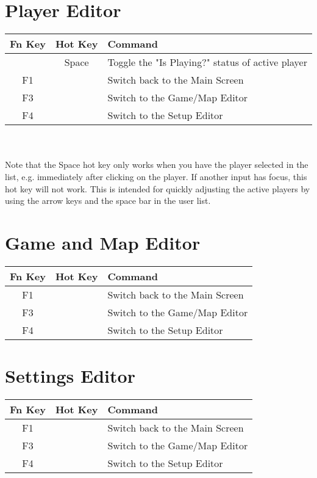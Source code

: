 \documentclass[10pt,a4paper]{report}
\begin{document}
\section{Player Editor}
\begin{tabular}{c|c|l}
Fn Key & Hot Key & Command \\
\hline
& Space & Toggle the "Is Playing?" status of active player \\
F1 & & Switch back to the Main Screen \\
F3 & & Switch to the Game/Map Editor \\
F4 & & Switch to the Setup Editor \\
\end{tabular}
\\
\\
Note that the Space hot key only works when you have the player selected in the list, e.g. immediately after clicking on the player.  If another input has focus, this hot key will not work.  This is intended for quickly adjusting the active players by using the arrow keys and the space bar in the user list.

\section{Game and Map Editor}
\begin{tabular}{c|c|l}
Fn Key & Hot Key & Command \\
\hline
F1 & & Switch back to the Main Screen \\
F3 & & Switch to the Game/Map Editor \\
F4 & & Switch to the Setup Editor \\
\end{tabular}

\section{Settings Editor}
\begin{tabular}{c|c|l}
Fn Key & Hot Key & Command \\
\hline
F1 & & Switch back to the Main Screen \\
F3 & & Switch to the Game/Map Editor \\
F4 & & Switch to the Setup Editor \\
\end{tabular}
\end{document}
